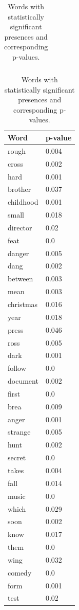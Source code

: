 \documentclass[12pt, oneside]{article}   	%
\begin{document}
\begin{table}
\begin{tabular}[t]{l|l}
\end{tabular}
\begin{tabular}[t]{l|l}
\textbf{Word}        & \textbf{p-value} \\ \hline
rough       & 0.004    \\
cross       & 0.002    \\
hard        & 0.001    \\
brother     & 0.037    \\
childhood   & 0.001    \\
small       & 0.018    \\
director    & 0.02     \\
feat        & 0.0      \\
danger      & 0.005    \\
dang        & 0.002    \\
between     & 0.003    \\
mean        & 0.003    \\
christmas   & 0.016    \\
year        & 0.018    \\
press       & 0.046    \\
ross        & 0.005    \\
dark        & 0.001    \\
follow      & 0.0      \\
document    & 0.002    \\
first       & 0.0      \\
brea        & 0.009    \\
anger       & 0.001    \\
strange     & 0.005    \\
hunt        & 0.002    \\
secret      & 0.0      \\
takes       & 0.004    \\
fall        & 0.014    \\
music       & 0.0      \\
which       & 0.029    \\
soon        & 0.002    \\
know        & 0.017    \\
them        & 0.0      \\
wing        & 0.032    \\
comedy      & 0.0      \\
form        & 0.001    \\
test        & 0.02     \\
\end{tabular}
\caption{\label{table:word_p_values}Words with statistically significant presences and corresponding p-values.}
\end{table}
\end{document}
